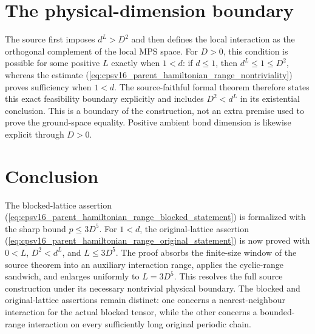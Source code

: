 \documentclass{article}
\begin{document}
\section{The physical-dimension boundary}

The source first imposes $d^L>D^2$ and then defines the local interaction as
the orthogonal complement of the local MPS space. For $D>0$, this condition is
possible for some positive $L$ exactly when $1<d$: if $d\leq1$, then
$d^L\leq1\leq D^2$, whereas the estimate
(\ref{eq:cpsv16_parent_hamiltonian_range_nontriviality}) proves sufficiency
when $1<d$. The source-faithful formal theorem therefore states this exact
feasibility boundary explicitly and includes $D^2<d^L$ in its existential
conclusion. This is a boundary of the construction, not an extra premise used
to prove the ground-space equality. Positive ambient bond dimension is
likewise explicit through $D>0$.

\section{Conclusion}

The blocked-lattice assertion
(\ref{eq:cpsv16_parent_hamiltonian_range_blocked_statement}) is formalized
with the sharp bound $p\leq3D^5$. For $1<d$, the original-lattice assertion
(\ref{eq:cpsv16_parent_hamiltonian_range_original_statement}) is now proved
with $0<L$, $D^2<d^L$, and $L\leq3D^5$. The proof absorbs the finite-size
window of the source theorem into an auxiliary interaction range, applies the
cyclic-range sandwich, and enlarges uniformly to $L=3D^5$. This resolves the
full source construction under its necessary nontrivial physical boundary.
The blocked and original-lattice assertions remain distinct: one concerns a
nearest-neighbour interaction for the actual blocked tensor, while the other
concerns a bounded-range interaction on every sufficiently long original
periodic chain.



\end{document}
